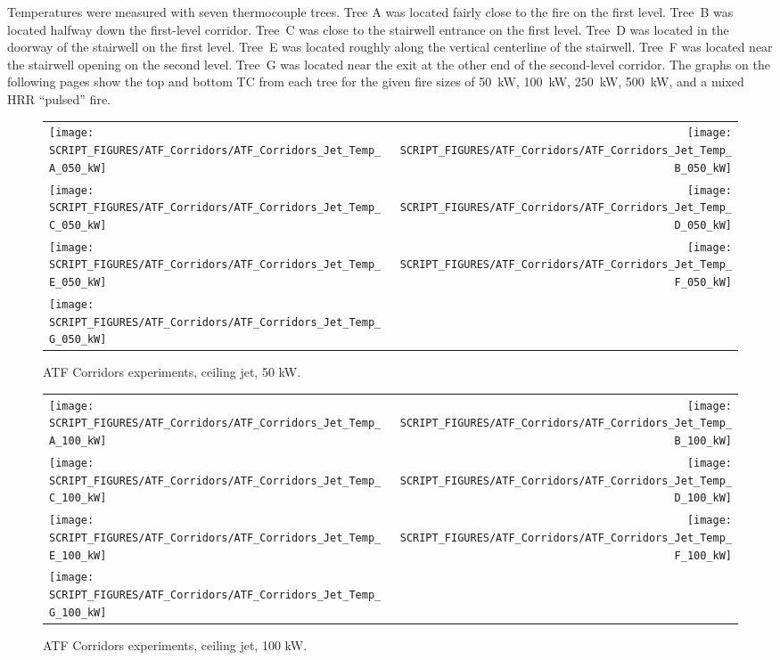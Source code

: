 Temperatures were measured with seven thermocouple trees. Tree A was located fairly close to the fire on the first level. Tree~B
was located halfway down the first-level corridor. Tree~C was close to the stairwell entrance on the first level. Tree~D was located
in the doorway of the stairwell on the first level. Tree~E was located roughly along the vertical centerline of the
stairwell. Tree~F was located near the stairwell opening on the second level. Tree~G was located near the exit at the
other end of the second-level corridor. The graphs on the following pages show the top and bottom TC from each tree for
the given fire sizes of 50~kW, 100~kW, 250~kW, 500~kW, and a mixed HRR ``pulsed'' fire.

\newpage

\begin{figure}[p]
\begin{tabular*}{\textwidth}{l@{\extracolsep{\fill}}r}
\texttt{[image: SCRIPT\_FIGURES/ATF\_Corridors/ATF\_Corridors\_Jet\_Temp\_A\_050\_kW]} &
\texttt{[image: SCRIPT\_FIGURES/ATF\_Corridors/ATF\_Corridors\_Jet\_Temp\_B\_050\_kW]} \\
\texttt{[image: SCRIPT\_FIGURES/ATF\_Corridors/ATF\_Corridors\_Jet\_Temp\_C\_050\_kW]} &
\texttt{[image: SCRIPT\_FIGURES/ATF\_Corridors/ATF\_Corridors\_Jet\_Temp\_D\_050\_kW]} \\
\texttt{[image: SCRIPT\_FIGURES/ATF\_Corridors/ATF\_Corridors\_Jet\_Temp\_E\_050\_kW]} &
\texttt{[image: SCRIPT\_FIGURES/ATF\_Corridors/ATF\_Corridors\_Jet\_Temp\_F\_050\_kW]} \\
\texttt{[image: SCRIPT\_FIGURES/ATF\_Corridors/ATF\_Corridors\_Jet\_Temp\_G\_050\_kW]} &
\end{tabular*}
\caption[ATF Corridors experiments, ceiling jet, 50 kW]
{ATF Corridors experiments, ceiling jet, 50 kW.}
\label{ATF_Corridors_Jet_Temp_50_kW}
\end{figure}

\begin{figure}[p]
\begin{tabular*}{\textwidth}{l@{\extracolsep{\fill}}r}
\texttt{[image: SCRIPT\_FIGURES/ATF\_Corridors/ATF\_Corridors\_Jet\_Temp\_A\_100\_kW]} &
\texttt{[image: SCRIPT\_FIGURES/ATF\_Corridors/ATF\_Corridors\_Jet\_Temp\_B\_100\_kW]} \\
\texttt{[image: SCRIPT\_FIGURES/ATF\_Corridors/ATF\_Corridors\_Jet\_Temp\_C\_100\_kW]} &
\texttt{[image: SCRIPT\_FIGURES/ATF\_Corridors/ATF\_Corridors\_Jet\_Temp\_D\_100\_kW]} \\
\texttt{[image: SCRIPT\_FIGURES/ATF\_Corridors/ATF\_Corridors\_Jet\_Temp\_E\_100\_kW]} &
\texttt{[image: SCRIPT\_FIGURES/ATF\_Corridors/ATF\_Corridors\_Jet\_Temp\_F\_100\_kW]} \\
\texttt{[image: SCRIPT\_FIGURES/ATF\_Corridors/ATF\_Corridors\_Jet\_Temp\_G\_100\_kW]} &
\end{tabular*}
\caption[ATF Corridors experiments, ceiling jet, 100 kW]
{ATF Corridors experiments, ceiling jet, 100 kW.}
\label{ATF_Corridors_Jet_Temp_100_kW}
\end{figure}

